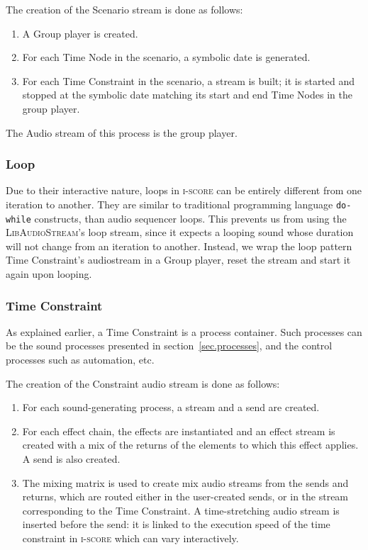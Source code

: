 \documentclass{article}
\newcommand*{\LibAudioStream}{\textsc{LibAudioStream}\xspace}
\newcommand*{\iscore}{\textsc{i-score}\xspace}
\begin{document}
The creation of the Scenario stream is done as follows: 
\begin{enumerate}
	\item A Group player is created.
	\item For each Time Node in the scenario, a symbolic date is generated.
	\item For each Time Constraint in the scenario, a stream is built; it is started and stopped at the symbolic date matching its start and end Time Nodes in the group player.
\end{enumerate}

The Audio stream of this process is the group player.

\subsubsection{Loop}
Due to their interactive nature, loops in \iscore can be entirely different from 
one iteration to another. 
They are similar to traditional programming language \texttt{do-while} constructs, than audio sequencer loops.
This prevents us from using the \LibAudioStream's loop stream, since 
it expects a looping sound whose duration will not change from an iteration to another.
Instead, we wrap the loop pattern Time Constraint's audiostream in a Group player, reset the stream and start it again upon looping.

\subsubsection{Time Constraint}
As explained earlier, a Time Constraint is a process container.
Such processes can be the sound processes presented in section~\ref{sec.processes}, and 
the control processes such as automation, etc.

The creation of the Constraint audio stream is done as follows: 
\begin{enumerate}
    \item For each sound-generating process, a stream and a send are created.
    \item For each effect chain, the effects are instantiated and an effect stream is created with a mix of the returns of the elements to which this effect applies.
    A send is also created.
    \item The mixing matrix is used to create mix audio streams from the sends and returns, which are routed either in the user-created sends, or in the stream corresponding to the Time Constraint.
    A time-stretching audio stream is inserted before the send: it is linked to the execution speed of the time constraint in \iscore which can vary interactively.
\end{enumerate} 
\end{document}
